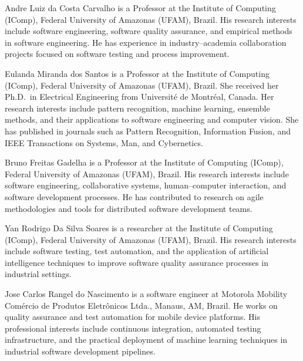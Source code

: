 \documentclass[10pt,journal,compsoc]{IEEEtran}
\begin{document}
\begin{IEEEbiographynophoto}{Andre Luiz da Costa Carvalho}
is a Professor at the Institute of Computing (IComp), Federal University
of Amazonas (UFAM), Brazil. His research interests include software
engineering, software quality assurance, and empirical methods in software
engineering. He has experience in industry--academia collaboration projects
focused on software testing and process improvement.
\end{IEEEbiographynophoto}

\begin{IEEEbiographynophoto}{Eulanda Miranda dos Santos}
is a Professor at the Institute of Computing (IComp), Federal University
of Amazonas (UFAM), Brazil. She received her Ph.D.\ in Electrical
Engineering from Universit\'{e} de Montr\'{e}al, Canada. Her research
interests include pattern recognition, machine learning, ensemble methods,
and their applications to software engineering and computer vision. She has
published in journals such as Pattern Recognition, Information Fusion,
and IEEE Transactions on Systems, Man, and Cybernetics.
\end{IEEEbiographynophoto}

\begin{IEEEbiographynophoto}{Bruno Freitas Gadelha}
is a Professor at the Institute of Computing (IComp), Federal University
of Amazonas (UFAM), Brazil. His research interests include software
engineering, collaborative systems, human--computer interaction, and
software development processes. He has contributed to research on agile
methodologies and tools for distributed software development teams.
\end{IEEEbiographynophoto}

\begin{IEEEbiographynophoto}{Yan Rodrigo Da Silva Soares}
is a researcher at the Institute of Computing (IComp), Federal University of
Amazonas (UFAM), Brazil. His research interests include software testing,
test automation, and the application of artificial intelligence techniques
to improve software quality assurance processes in industrial settings.
\end{IEEEbiographynophoto}

\begin{IEEEbiographynophoto}{Jose Carlos Rangel do Nascimento}
is a software engineer at Motorola Mobility Com\'{e}rcio de Produtos Eletr\^{o}nicos Ltda., Manaus, AM, Brazil. He
works on quality assurance and test automation for mobile device platforms.
His professional interests include continuous integration, automated testing
infrastructure, and the practical deployment of machine learning techniques
in industrial software development pipelines.
\end{IEEEbiographynophoto}
\end{document}
